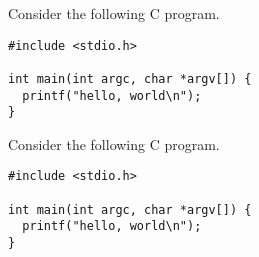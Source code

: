 \documentclass{article}
\begin{document}
\begin{exercise}[points=6]
Consider the following C program.
\begin{lstlisting}
#include <stdio.h>

int main(int argc, char *argv[]) {
  printf("hello, world\n");
}
\end{lstlisting}
\end{exercise}
\begin{solution}
Consider the following C program.
\begin{lstlisting}
#include <stdio.h>

int main(int argc, char *argv[]) {
  printf("hello, world\n");
}
\end{lstlisting}
\end{solution}

\pagebreak
\printsolutions 
\end{document}
